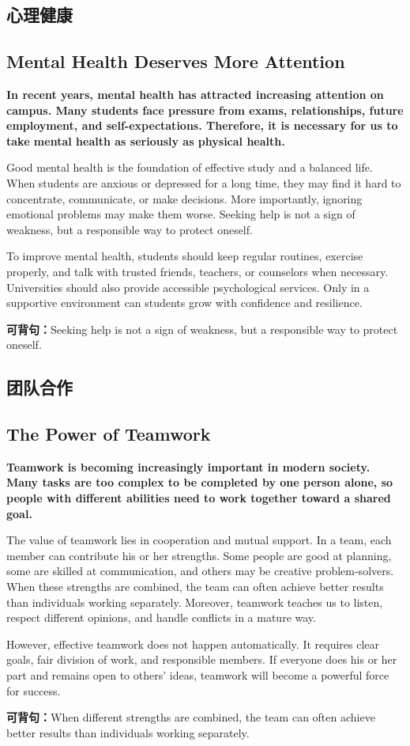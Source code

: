 ﻿\documentclass[UTF8,zihao=-4]{ctexart}
\newenvironment{essayblock}{\Needspace{0.46\textheight}\begin{samepage}}{\end{samepage}\vspace{0.2em}}
\newcommand{\essay}[3]{\section{#1}\subsection{#2}\textbf{#3}\par}
\newcommand{\keysentence}[1]{\begin{sentbox}\textbf{可背句：}#1\end{sentbox}}
\begin{document}
\begin{essayblock}
\essay{心理健康}{Mental Health Deserves More Attention}{In recent years, mental health has attracted increasing attention on campus. Many students face pressure from exams, relationships, future employment, and self-expectations. Therefore, it is necessary for us to take mental health as seriously as physical health.}

Good mental health is the foundation of effective study and a balanced life. When students are anxious or depressed for a long time, they may find it hard to concentrate, communicate, or make decisions. More importantly, ignoring emotional problems may make them worse. Seeking help is not a sign of weakness, but a responsible way to protect oneself.

To improve mental health, students should keep regular routines, exercise properly, and talk with trusted friends, teachers, or counselors when necessary. Universities should also provide accessible psychological services. Only in a supportive environment can students grow with confidence and resilience.

\keysentence{Seeking help is not a sign of weakness, but a responsible way to protect oneself.}
\end{essayblock}

\begin{essayblock}
\essay{团队合作}{The Power of Teamwork}{Teamwork is becoming increasingly important in modern society. Many tasks are too complex to be completed by one person alone, so people with different abilities need to work together toward a shared goal.}

The value of teamwork lies in cooperation and mutual support. In a team, each member can contribute his or her strengths. Some people are good at planning, some are skilled at communication, and others may be creative problem-solvers. When these strengths are combined, the team can often achieve better results than individuals working separately. Moreover, teamwork teaches us to listen, respect different opinions, and handle conflicts in a mature way.

However, effective teamwork does not happen automatically. It requires clear goals, fair division of work, and responsible members. If everyone does his or her part and remains open to others' ideas, teamwork will become a powerful force for success.

\keysentence{When different strengths are combined, the team can often achieve better results than individuals working separately.}
\end{essayblock}
\end{document}
